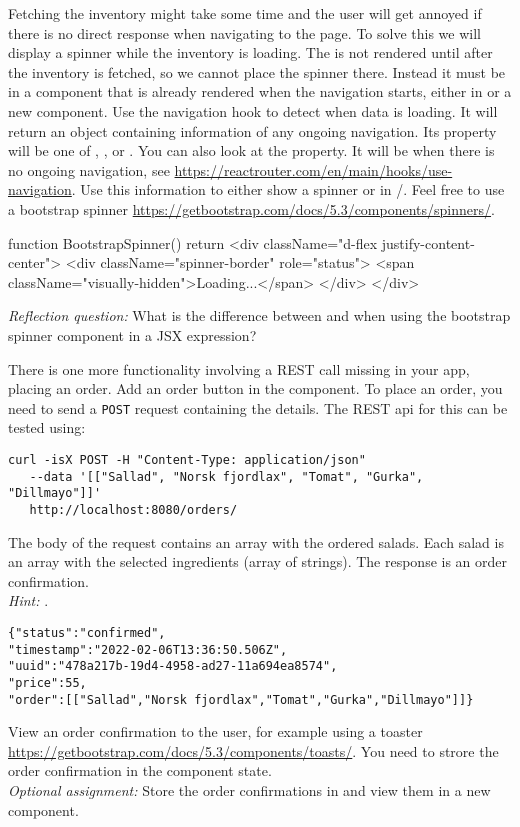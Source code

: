 \documentclass[fleqn, article, a4paper]{memoir}
\begin{document}
\begin{Assignments}
\item Fetching the inventory might take some time and the user will get annoyed if there is no direct response when navigating to the  page. To solve this we will display a spinner while the inventory is loading. The  is not rendered until after the inventory is fetched, so we cannot place the spinner there. Instead it must be in a component that is already rendered when the navigation starts, either in  or a new  component. Use the navigation hook to detect when data is loading. It will return an object containing information of any ongoing navigation. Its  property will be one of , , or . You can also look at the  property. It will be  when there is no ongoing navigation, see \url{https://reactrouter.com/en/main/hooks/use-navigation}. Use this information to either show a spinner or   in /. Feel free to use a bootstrap spinner \url{https://getbootstrap.com/docs/5.3/components/spinners/}.
\begin{Code}
function BootstrapSpinner() {
  return <div className="d-flex justify-content-center">
    <div className="spinner-border" role="status">
      <span className="visually-hidden">Loading...</span>
    </div>
  </div>
}
\end{Code}
\emph{Reflection question:} What is the difference between  and  when using the bootstrap spinner component in a JSX expression?

\item There is one more functionality involving a REST call missing in your app, placing an order. Add an order button in the  component. To place an order, you need to send a \texttt{POST} request containing the details. The REST api for this can be tested using:
\\ \noindent \begin{verbatim}
curl -isX POST -H "Content-Type: application/json" 
   --data '[["Sallad", "Norsk fjordlax", "Tomat", "Gurka", "Dillmayo"]]'
   http://localhost:8080/orders/
\end{verbatim}
\noindent The body of the request contains an array with the ordered salads. Each salad is an array with the selected ingredients (array of strings). The response is an order confirmation.
\\\emph{Hint:} .
\begin{verbatim}
{"status":"confirmed",
"timestamp":"2022-02-06T13:36:50.506Z",
"uuid":"478a217b-19d4-4958-ad27-11a694ea8574",
"price":55,
"order":[["Sallad","Norsk fjordlax","Tomat","Gurka","Dillmayo"]]}
\end{verbatim}
\noindent View an order confirmation to the user, for example using a toaster \url{https://getbootstrap.com/docs/5.3/components/toasts/}. You need to strore the order confirmation in the component state.
\\\emph{Optional assignment:} Store the order confirmations in  and view them in a new component.


\end{Assignments}
\end{document}
